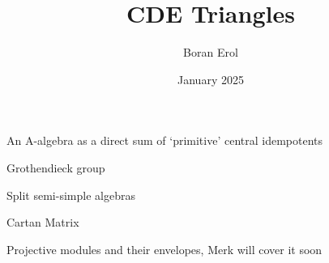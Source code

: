 \documentclass{article}
\title{CDE Triangles}
\date{January 2025}
\author{Boran Erol}
\theoremstyle{definition}
\begin{document}
\maketitle

An A-algebra as a direct sum of `primitive' central idempotents

Grothendieck group

Split semi-simple algebras

Cartan Matrix

Projective modules and their envelopes, Merk will cover it soon
\end{document}
